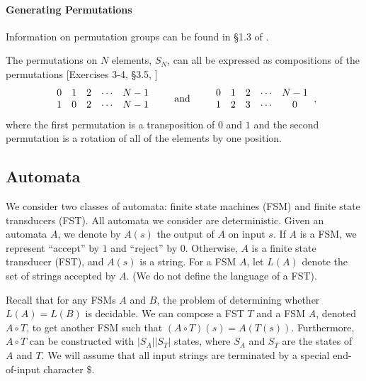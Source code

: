 \documentclass{llncs}
\begin{document}
\paragraph{Generating Permutations}
Information on permutation groups can be found in \S1.3 of \cite{dummitfoote}.

\makeatletter
\renewcommand{\@cite}[1]{#1}
\makeatother
The permutations on \(N\) elements, \(S_{N}\), can all be expressed as compositions of the permutations [Exercises 3-4, \S3.5, \cite{dummitfoote}]
\[\begin{tabular}{c@{\hspace{1em}}c@{\hspace{1em}}c@{\hspace{1em}}c@{\hspace{1em}}c}
0 & 1 & 2 & \(\dotsm\) & \(N-1\)\\
1 & 0 & 2 & \(\dotsm\) & \(N-1\)
\end{tabular}
\qquad\textrm{and}\qquad
\begin{tabular}{c@{\hspace{1em}}c@{\hspace{1em}}c@{\hspace{1em}}c@{\hspace{1em}}c}
0 & 1 & 2 & \(\dotsm\) & \(N-1\)\\
1 & 2 & 3 & \(\dotsm\) & 0
\end{tabular},\]
where the first permutation is a transposition of \(0\) and \(1\) and the second permutation is a rotation of all of the elements by one position.
\makeatletter
\renewcommand{\@cite}[1]{[#1]}
\makeatother

\subsection{Automata}
We consider two classes of automata: finite state machines (FSM) and finite
state transducers (FST). All automata we consider are deterministic. Given an
automata $A$, we denote by $A(s)$ the output of $A$ on input $s$. If $A$ is a
FSM, we represent ``accept'' by $1$ and ``reject'' by $0$. Otherwise, $A$ is a
finite state transducer (FST), and $A(s)$ is a string. For a FSM $A$, let $L(A)$
denote the set of strings accepted by $A$. (We do not define the language of a
FST).

Recall that for any FSMs $A$ and $B$, the problem of determining whether $L(A) =
L(B)$ is decidable. We can compose a FST $T$ and a FSM $A$, denoted $A \circ T$,
to get another FSM such that $(A\circ T)(s) = A(T(s))$.
Furthermore, $A\circ T$ can be constructed with $|S_A||S_T|$ states,
where $S_A$ and $S_T$ are the states of $A$ and $T$.
We will assume that all input strings are terminated by a special end-of-input character \$.
\end{document}
